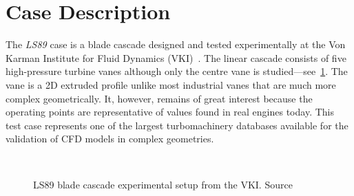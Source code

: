\section{Case Description}\label{sec:ls89_case}
The \textit{LS89} case is a blade cascade designed and tested experimentally at the Von Karman Institute for Fluid Dynamics (VKI)~\cite{arts1990}. The linear cascade consists of five high-pressure turbine vanes although only the centre vane is studied---see~\cref{fig:vki-setup}. The vane is a 2D extruded profile unlike most industrial vanes that are much more complex geometrically. It, however, remains of great interest because the operating points are representative of values found in real engines today. This test case represents one of the largest turbomachinery databases available for the validation of CFD models in complex geometries.

\begin{figure}[!ht]               
\centering
{}
 ~       
\qquad       
{}
\caption{LS89 blade cascade experimental setup from the VKI. Source~\cite{arts1990}}
\label{fig:vki-setup}
\end{figure}


